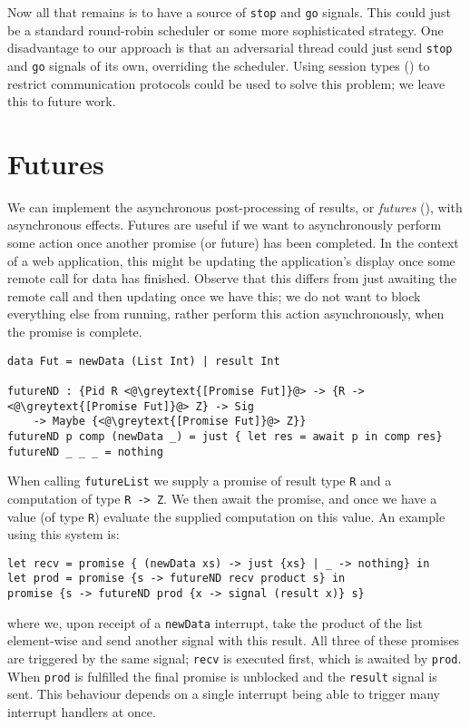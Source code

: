 \documentclass[msc,deptreport,cs]{infthesis} %
\newcommand{\code}[1]{\lstinline{#1}}
\newcommand{\greytext}[1]{\textcolor{black!40}{#1}}
\begin{document}
Now all that remains is to have a source of \code{stop} and \code{go} signals.
This could just be a standard round-robin scheduler or some more sophisticated
strategy. One disadvantage to our approach is that an adversarial thread could
just send \code{stop} and \code{go} signals of its own, overriding the
scheduler. Using session types (\cite{honda1998language}) to restrict
communication protocols could be used to solve this problem; we leave this to future work.

\section{Futures}
\label{sec:futures}

We can implement the asynchronous post-processing of results, or \emph{futures}
(\cite{schwinghammer2002concurrent}), with asynchronous effects. Futures are
useful if we want to asynchronously perform some action once another promise (or
future) has been completed. In the context of a web application, this might be
updating the application's display once some remote call for data has finished.
Observe that this differs from just awaiting the remote call and then updating
once we have this; we do not want to block everything else from running, rather
perform this action asynchronously, when the promise is complete.

\begin{lstlisting}
data Fut = newData (List Int) | result Int

futureND : {Pid R <@\greytext{[Promise Fut]}@> -> {R -> <@\greytext{[Promise Fut]}@> Z} -> Sig
    -> Maybe {<@\greytext{[Promise Fut]}@> Z}}
futureND p comp (newData _) = just { let res = await p in comp res}
futureND _ _ _ = nothing
\end{lstlisting}

\noindent When calling \code{futureList} we supply a promise of result type
\code{R} and a computation of type \code{R -> Z}. We then await the promise, and
once we have a value (of type \code{R}) evaluate the supplied computation on
this value. An example using this system is:

\begin{lstlisting}
let recv = promise { (newData xs) -> just {xs} | _ -> nothing} in
let prod = promise {s -> futureND recv product s} in
promise {s -> futureND prod {x -> signal (result x)} s}
\end{lstlisting}

\noindent where we, upon receipt of a \code{newData} interrupt, take the product
of the list element-wise and send another signal with this result. All three of
these promises are triggered by the same signal; \code{recv} is executed first,
which is awaited by \code{prod}. When \code{prod} is fulfilled the final promise
is unblocked and the \code{result} signal is sent. This behaviour depends on a
single interrupt being able to trigger many interrupt handlers at once.
\end{document}
